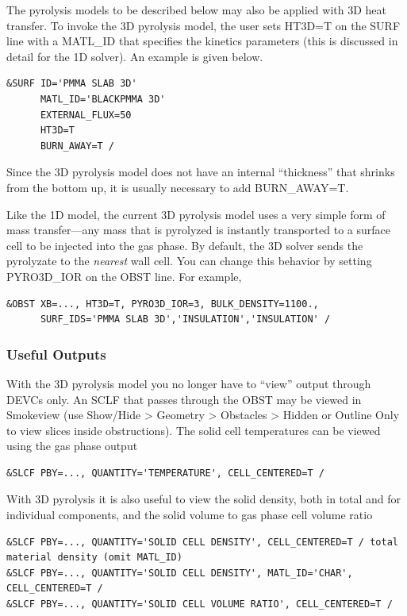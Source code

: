 \documentclass[11pt]{book}
\begin{document}
The pyrolysis models to be described below may also be applied with 3D heat transfer.  To invoke the 3D pyrolysis model, the user sets {\ct HT3D=T} on the {\ct SURF} line with a {\ct MATL\_ID} that specifies the kinetics parameters (this is discussed in detail for the 1D solver).  An example is given below.
\begin{lstlisting}
&SURF ID='PMMA SLAB 3D'
      MATL_ID='BLACKPMMA 3D'
      EXTERNAL_FLUX=50
      HT3D=T
      BURN_AWAY=T /
\end{lstlisting}
Since the 3D pyrolysis model does not have an internal ``thickness'' that shrinks from the bottom up, it is usually necessary to add {\ct BURN\_AWAY=T}.

Like the 1D model, the current 3D pyrolysis model uses a very simple form of mass transfer---any mass that is pyrolyzed is instantly transported to a surface cell to be injected into the gas phase.  By default, the 3D solver sends the pyrolyzate to the \emph{nearest} wall cell.  You can change this behavior by setting {\ct PYRO3D\_IOR} on the {\ct OBST} line.  For example,
\begin{lstlisting}
&OBST XB=..., HT3D=T, PYRO3D_IOR=3, BULK_DENSITY=1100.,
      SURF_IDS='PMMA SLAB 3D','INSULATION','INSULATION' /
\end{lstlisting}

\subsubsection*{Useful Outputs}

With the 3D pyrolysis model you no longer have to ``view'' output through {\ct DEVC}s only.  An {\ct SCLF} that passes through the {\ct OBST} may be viewed in Smokeview (use Show/Hide > Geometry > Obstacles > Hidden or Outline Only to view slices inside obstructions).  The solid cell temperatures can be viewed using the gas phase output
\begin{lstlisting}
&SLCF PBY=..., QUANTITY='TEMPERATURE', CELL_CENTERED=T /
\end{lstlisting}

With 3D pyrolysis it is also useful to view the solid density, both in total and for individual components, and the solid volume to gas phase cell volume ratio
\begin{lstlisting}
&SLCF PBY=..., QUANTITY='SOLID CELL DENSITY', CELL_CENTERED=T / total material density (omit MATL_ID)
&SLCF PBY=..., QUANTITY='SOLID CELL DENSITY', MATL_ID='CHAR', CELL_CENTERED=T /
&SLCF PBY=..., QUANTITY='SOLID CELL VOLUME RATIO', CELL_CENTERED=T /
\end{lstlisting}
\end{document}
